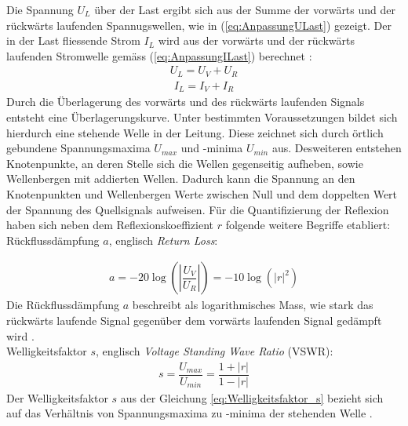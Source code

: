 Die Spannung $U_L$ über der Last ergibt sich aus der Summe der vorwärts und der rückwärts laufenden Spannugswellen, wie  in (\ref{eq:AnpassungULast}) gezeigt. Der in der Last fliessende Strom $I_L$ wird aus der vorwärts und der rückwärts laufenden Stromwelle gemäss (\ref{eq:AnpassungILast}) berechnet \cite{Tekom}:
\begin{eqnarray}\label{eq:AnpassungULast}
U_L =U_V +U_R
\end{eqnarray}
\begin{eqnarray}\label{eq:AnpassungILast}
I_L = I_V + I_R
\end{eqnarray}
Durch die Überlagerung des vorwärts und des rückwärts laufenden Signals entsteht eine Überlagerungskurve. Unter bestimmten Voraussetzungen bildet sich hierdurch eine stehende Welle in der Leitung. Diese zeichnet sich durch örtlich gebundene Spannungsmaxima $U_{max}$ und -minima $U_{min}$ aus. Desweiteren entstehen Knotenpunkte, an deren Stelle sich die Wellen gegenseitig aufheben, sowie Wellenbergen mit addierten Wellen. Dadurch kann die Spannung an den Knotenpunkten und Wellenbergen Werte zwischen Null und dem doppelten Wert der Spannung des Quellsignals aufweisen. Für die Quantifizierung der Reflexion haben sich neben dem Reflexionskoeffizient $r$ folgende weitere Begriffe etabliert:\\

Rückflussdämpfung $a$, englisch \textit{Return Loss}:

\begin{eqnarray}\label{eq:Ruckflussdämpfung_a}
a=-20\log\left(\left| \dfrac{U_V}{U_R}\right| \right)=-10\log(|r|^{2})
\end{eqnarray}
Die Rückflussdämpfung $a$ beschreibt als logarithmisches Mass, wie stark das rückwärts laufende Signal gegenüber dem vorwärts laufenden Signal gedämpft wird \cite{Tekom}.\\


Welligkeitsfaktor $s$, englisch \textit{Voltage Standing Wave Ratio} (VSWR):
\begin{eqnarray}\label{eq:Welligkeitsfaktor_s}
s=\dfrac{U_{max}}{U_{min}}=\dfrac{1+|r|}{1-|r|}
\end{eqnarray}
Der Welligkeitsfaktor $s$ aus der Gleichung \ref{eq:Welligkeitsfaktor_s} bezieht sich auf das Verhältnis von Spannungsmaxima zu -minima der stehenden Welle \cite{Tekom}.\\

